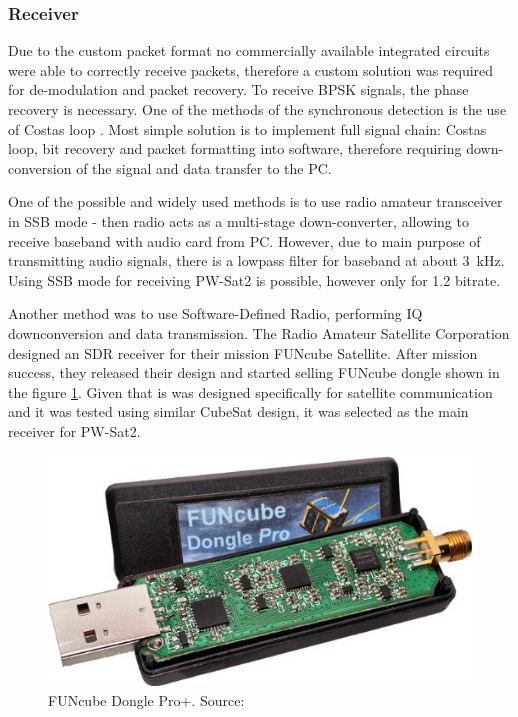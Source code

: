 \subsubsection{Receiver}
Due to the custom packet format no commercially available integrated circuits were able to correctly receive packets, therefore a custom solution was required for de-modulation and packet recovery.
To receive BPSK signals, the phase recovery is necessary. One of the methods of the synchronous detection is the use of Costas loop \cite{costas_loop}. Most simple solution is to implement full signal chain: Costas loop, bit recovery and packet formatting into software, therefore requiring down-conversion of the signal and data transfer to the PC. 

One of the possible and widely used methods is to use radio amateur transceiver in SSB mode - then radio acts as a multi-stage down-converter, allowing to receive baseband with audio card from PC. However, due to main purpose of transmitting audio signals, there is a lowpass filter for baseband at about \SI{3}{\kHz}. Using SSB mode for receiving PW-Sat2 is possible, however only for \SI{1.2}{\kbps} bitrate.

Another method was to use Software-Defined Radio, performing IQ downconversion and data transmission. The Radio Amateur Satellite Corporation designed an SDR receiver for their mission FUNcube Satellite. After mission success, they released their design and started selling FUNcube dongle shown in the figure \ref{funcube_pic}. Given that is was designed specifically for satellite communication and it was tested using similar CubeSat design, it was selected as the main receiver for PW-Sat2.

\begin{figure}[H]
    \centering
    \includegraphics[width=0.6\paperwidth]{img/2/funcube.jpg}
    \caption{FUNcube Dongle Pro+. Source: \cite{funcube}}
    \label{funcube_pic}
\end{figure}

